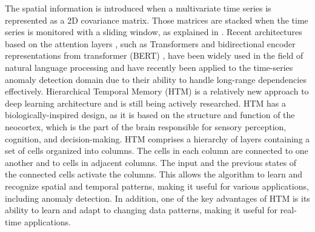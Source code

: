 The spatial information is introduced when a multivariate time series is represented as a 2D covariance matrix. Those matrices are stacked when the time series is monitored with a sliding window, as explained in \cite{choi2021deep}. Recent architectures based on the attention layers \cite{Vaswani_2017}, such as Transformers and bidirectional encoder representations from transformer (BERT) \cite{Devlin_2018}, have been widely used in the field of natural language processing and have recently been applied to the time-series anomaly detection domain due to their ability to handle long-range dependencies effectively. Hierarchical Temporal Memory (HTM) \cite{Hawkins_2016} is a relatively new approach to deep learning architecture and is still being actively researched. HTM has a biologically-inspired design, as it is based on the structure and function of the neocortex, which is the part of the brain responsible for sensory perception, cognition, and decision-making. HTM comprises a hierarchy of layers containing a set of cells organized into columns. The cells in each column are connected to one another and to cells in adjacent columns. The input and the previous states of the connected cells activate the columns. This allows the algorithm to learn and recognize spatial and temporal patterns, making it useful for various applications, including anomaly detection. In addition, one of the key advantages of HTM is its ability to learn and adapt to changing data patterns, making it useful for real-time applications. 

